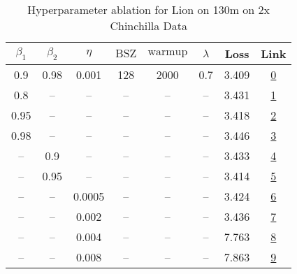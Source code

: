 \begin{table}[H]
\centering
\caption{Hyperparameter ablation for Lion on 130m on 2x Chinchilla Data}
\label{tab:ablation_lion_130m_2}
\begin{tabular}{cccccccc}
\toprule
$\beta_1$ & $\beta_2$ & $\eta$ & $\mathrm{BSZ}$ & $\mathrm{warmup}$ & $\lambda$ & Loss & Link \\
\midrule
0.9 & 0.98 & 0.001 & 128 & 2000 & 0.7 & 3.409 & \href{https://wandb.ai/stanford-mercury/optimizer-scaling/runs/sweep-130m-5B-lion5d07e9lr0.001-wd0.7-minlr0-warmup2000-b10.9-b2-6d65d0}{0} \\
\midrule
0.8 & -- & -- & -- & -- & -- & 3.431 & \href{https://wandb.ai/stanford-mercury/optimizer-scaling/runs/sweep-130m-5B-lion032cb6lr0.001-wd0.7-minlr0-warmup2000-b10.8-b2-b99140}{1} \\
0.95 & -- & -- & -- & -- & -- & 3.418 & \href{https://wandb.ai/stanford-mercury/optimizer-scaling/runs/sweep-130m-5B-lion5c3104lr0.001-wd0.7-minlr0-warmup2000-b10.95-b-252d6c}{2} \\
0.98 & -- & -- & -- & -- & -- & 3.446 & \href{https://wandb.ai/stanford-mercury/optimizer-scaling/runs/sweep-130m-5B-lionbd100dlr0.001-wd0.7-minlr0-warmup2000-b10.98-b-47f9a8}{3} \\
-- & 0.9 & -- & -- & -- & -- & 3.433 & \href{https://wandb.ai/stanford-mercury/optimizer-scaling/runs/sweep-130m-5B-lion9321cblr0.001-wd0.7-minlr0-warmup2000-b10.9-b2-f29f78}{4} \\
-- & 0.95 & -- & -- & -- & -- & 3.414 & \href{https://wandb.ai/stanford-mercury/optimizer-scaling/runs/sweep-130m-5B-lione0352dlr0.001-wd0.7-minlr0-warmup2000-b10.9-b2-89e6a1}{5} \\
-- & -- & 0.0005 & -- & -- & -- & 3.424 & \href{https://wandb.ai/stanford-mercury/optimizer-scaling/runs/sweep-130m-5B-lion4ce7d8lr0.0005-wd0.7-minlr0-warmup2000-b10.9-b-0451dc}{6} \\
-- & -- & 0.002 & -- & -- & -- & 3.436 & \href{https://wandb.ai/stanford-mercury/optimizer-scaling/runs/sweep-130m-5B-lion868003lr0.002-wd0.7-minlr0-warmup2000-b10.9-b2-820b68}{7} \\
-- & -- & 0.004 & -- & -- & -- & 7.763 & \href{https://wandb.ai/stanford-mercury/optimizer-scaling/runs/sweep-130m-5B-lione9d38clr0.004-wd0.7-minlr0-warmup2000-b10.9-b2-c874b3}{8} \\
-- & -- & 0.008 & -- & -- & -- & 7.863 & \href{https://wandb.ai/stanford-mercury/optimizer-scaling/runs/sweep-130m-5B-lion194886lr0.008-wd0.7-minlr0-warmup2000-b10.9-b2-94764e}{9} \\

\end{tabular}
\end{table}
